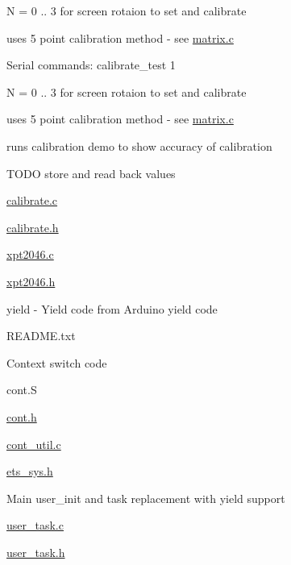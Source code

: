 \begin{DoxyItemize}
\begin{DoxyItemize}
\begin{DoxyItemize}
\item N = 0 .. 3 for screen rotaion to set and calibrate
\item uses 5 point calibration method -\/ see \hyperlink{matrix_8c}{matrix.\+c}
\end{DoxyItemize}
\item Serial commands\+: calibrate\+\_\+test 1
\begin{DoxyItemize}
\item N = 0 .. 3 for screen rotaion to set and calibrate
\item uses 5 point calibration method -\/ see \hyperlink{matrix_8c}{matrix.\+c}
\item runs calibration demo to show accuracy of calibration
\end{DoxyItemize}
\item T\+O\+DO store and read back values
\item \hyperlink{calibrate_8c}{calibrate.\+c}
\item \hyperlink{calibrate_8h}{calibrate.\+h}
\item \hyperlink{xpt2046_8c}{xpt2046.\+c}
\item \hyperlink{xpt2046_8h}{xpt2046.\+h}
\end{DoxyItemize}
\item yield -\/ Yield code from Arduino yield code
\begin{DoxyItemize}
\item R\+E\+A\+D\+M\+E.\+txt
\item Context switch code
\begin{DoxyItemize}
\item cont.\+S
\item \hyperlink{cont_8h}{cont.\+h}
\item \hyperlink{cont__util_8c}{cont\+\_\+util.\+c}
\item \hyperlink{ets__sys_8h}{ets\+\_\+sys.\+h}
\end{DoxyItemize}
\item Main user\+\_\+init and task replacement with yield support
\begin{DoxyItemize}
\item \hyperlink{user__task_8c}{user\+\_\+task.\+c}
\item \hyperlink{user__task_8h}{user\+\_\+task.\+h}
\end{DoxyItemize}
\end{DoxyItemize}
\end{DoxyItemize}

